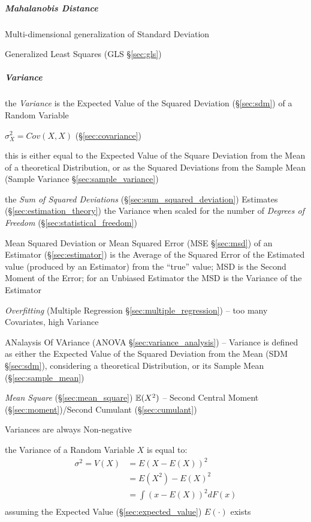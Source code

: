 \subparagraph{Mahalanobis Distance}\label{sec:mahalanobis_distance}\hfill

Multi-dimensional generalization of Standard Deviation

Generalized Least Squares (GLS \S\ref{sec:gls})



\subparagraph{Variance}\label{sec:variance}\hfill

the \emph{Variance} is the Expected Value of the Squared Deviation
(\S\ref{sec:sdm}) of a Random Variable

$\sigma_X^2 = Cov(X,X)$ (\S\ref{sec:covariance})

this is either equal to the Expected Value of the Square Deviation from the
Mean of a theoretical Distribution, or as the Squared Deviations from the Sample
Mean (Sample Variance \S\ref{sec:sample_variance})

the \emph{Sum of Squared Deviations} (\S\ref{sec:sum_squared_deviation})
Estimates (\S\ref{sec:estimation_theory}) the Variance when scaled for the
number of \emph{Degrees of Freedom} (\S\ref{sec:statistical_freedom})

\fist Mean Squared Deviation or Mean Squared Error (MSE \S\ref{sec:msd}) of an
Estimator (\S\ref{sec:estimator}) is the Average of the Squared Error of the
Estimated value (produced by an Estimator) from the ``true'' value; MSD is
the Second Moment of the Error; for an Unbiased Estimator the MSD is the
Variance of the Estimator

\emph{Overfitting} (Multiple Regression \S\ref{sec:multiple_regression}) -- too
many Covariates, high Variance

\fist ANalaysis Of VAriance (ANOVA \S\ref{sec:variance_analysis}) --
Variance is defined as either the Expected Value of the
Squared Deviation from the Mean (SDM \S\ref{sec:sdm}), considering a theoretical
Distribution, or its Sample Mean (\S\ref{sec:sample_mean})

\emph{Mean Square} (\S\ref{sec:mean_square}) $\mathbb{E}(X^2)$ -- Second Central
Moment (\S\ref{sec:moment})/Second Cumulant (\S\ref{sec:cumulant})

Variances are always Non-negative

the Variance of a Random Variable $X$ is equal to:
\begin{align*}
  \sigma^2 = V(X) & = E(X - E(X))^2   \\
                  & = E(X^2) - E(X)^2 \\
                  & = \int(x - E(X))^2 dF(x) \\
\end{align*}
assuming the Expected Value (\S\ref{sec:expected_value}) $E(\cdot)$ exists

